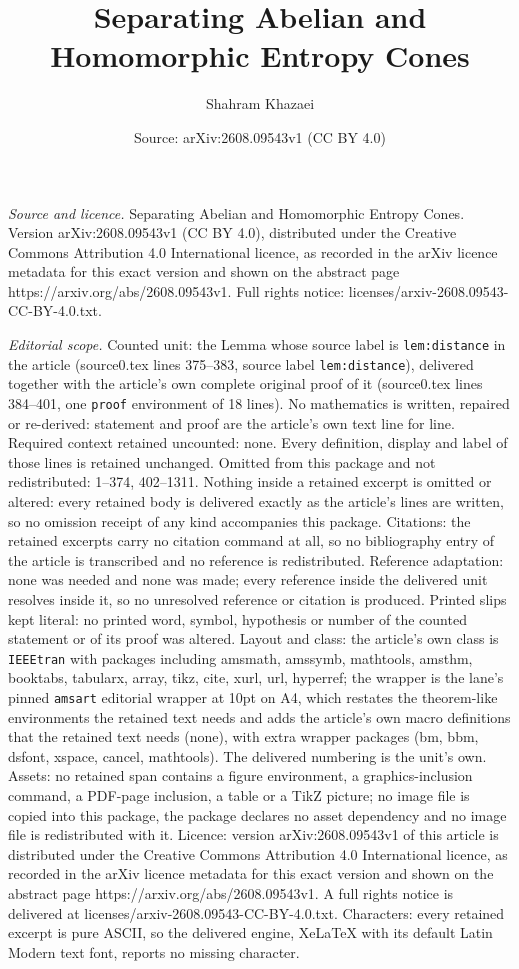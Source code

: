 \documentclass[10pt,a4paper]{amsart}
\title[Separating Abelian and Homomorphic Entropy Cones]{Separating Abelian and Homomorphic Entropy Cones}
\author{Shahram Khazaei}
\date{Source: arXiv:2608.09543v1 (CC BY 4.0)}
\begin{document}
\maketitle

\noindent\emph{Source and licence.} Separating Abelian and Homomorphic Entropy Cones. Version arXiv:2608.09543v1 (CC BY 4.0), distributed under the Creative Commons Attribution 4.0 International licence, as recorded in the arXiv licence metadata for this exact version and shown on the abstract page https://arxiv.org/abs/2608.09543v1. Full rights notice: licenses/arxiv-2608.09543-CC-BY-4.0.txt.\par\smallskip

\noindent\textit{Editorial scope.} Counted unit: the Lemma whose source label is \texttt{lem:distance} in the article (source0.tex lines 375--383, source label \texttt{lem:distance}), delivered together with the article's own complete original proof of it (source0.tex lines 384--401, one \texttt{proof} environment of 18 lines). No mathematics is written, repaired or re-derived: statement and proof are the article's own text line for line. Required context retained uncounted: none. Every definition, display and label of those lines is retained unchanged. Omitted from this package and not redistributed: 1--374, 402--1311. Nothing inside a retained excerpt is omitted or altered: every retained body is delivered exactly as the article's lines are written, so no omission receipt of any kind accompanies this package. Citations: the retained excerpts carry no citation command at all, so no bibliography entry of the article is transcribed and no reference is redistributed. Reference adaptation: none was needed and none was made; every reference inside the delivered unit resolves inside it, so no unresolved reference or citation is produced. Printed slips kept literal: no printed word, symbol, hypothesis or number of the counted statement or of its proof was altered. Layout and class: the article's own class is \texttt{IEEEtran} with packages including amsmath, amssymb, mathtools, amsthm, booktabs, tabularx, array, tikz, cite, xurl, url, hyperref; the wrapper is the lane's pinned \texttt{amsart} editorial wrapper at 10pt on A4, which restates the theorem-like environments the retained text needs and adds the article's own macro definitions that the retained text needs (none), with extra wrapper packages (bm, bbm, dsfont, xspace, cancel, mathtools). The delivered numbering is the unit's own. Assets: no retained span contains a figure environment, a graphics-inclusion command, a PDF-page inclusion, a table or a TikZ picture; no image file is copied into this package, the package declares no asset dependency and no image file is redistributed with it. Licence: version arXiv:2608.09543v1 of this article is distributed under the Creative Commons Attribution 4.0 International licence, as recorded in the arXiv licence metadata for this exact version and shown on the abstract page https://arxiv.org/abs/2608.09543v1. A full rights notice is delivered at licenses/arxiv-2608.09543-CC-BY-4.0.txt. Characters: every retained excerpt is pure ASCII, so the delivered engine, XeLaTeX with its default Latin Modern text font, reports no missing character.
\end{document}
